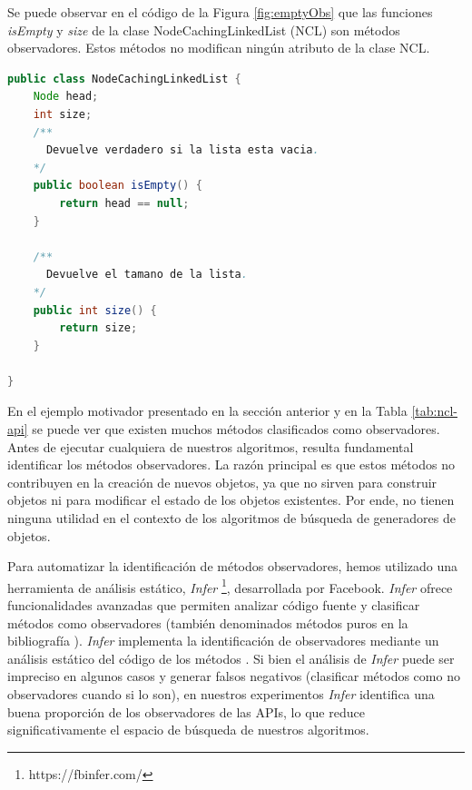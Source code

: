 Se puede observar en el código de la Figura \ref{fig:emptyObs} que las funciones \emph{isEmpty} y \emph{size} de la clase NodeCachingLinkedList (NCL) son métodos observadores.  Estos métodos no modifican ningún atributo de la clase NCL.
 
\begin{lstlisting}[language=Java, label=fig:emptyObs, caption=Algunos métodos observadores de la clase NCL. Se observa que no modifican el estado de NCL., captionpos=b, frame=tb, float=t]
public class NodeCachingLinkedList {
    Node head;
    int size;
    /**
      Devuelve verdadero si la lista esta vacia. 
    */ 
    public boolean isEmpty() { 
        return head == null; 
    }
    
    /**
      Devuelve el tamano de la lista. 
    */ 
    public int size() { 
        return size; 
    }
    
}
\end{lstlisting}


 En el ejemplo motivador presentado en la sección anterior y en la Tabla \ref{tab:ncl-api} se puede ver que existen muchos métodos clasificados como observadores. 
Antes de ejecutar cualquiera de nuestros algoritmos, resulta fundamental identificar los métodos observadores. La razón principal es que estos métodos no contribuyen en la creación de nuevos objetos, ya que no sirven para construir objetos ni para modificar el estado de los objetos existentes. Por ende, no tienen ninguna utilidad en el contexto de los algoritmos de búsqueda de generadores de objetos.

Para automatizar la identificación de métodos observadores, hemos utilizado una herramienta de análisis estático, \emph{Infer} \footnote{https://fbinfer.com/}, desarrollada por Facebook. \emph{Infer} ofrece funcionalidades avanzadas que permiten analizar código fuente y clasificar métodos como observadores \cite{Huang:2012} (también denominados métodos puros en la bibliografía \cite{Huang:2012}). \emph{Infer} implementa la identificación de observadores mediante un análisis estático del código de los métodos \cite{}. Si bien el análisis de \emph{Infer} puede ser impreciso en algunos casos y generar falsos negativos (clasificar métodos como no observadores cuando si lo son), en nuestros experimentos \emph{Infer}  identifica una buena proporción de los observadores de las APIs, lo que reduce significativamente el espacio de búsqueda de nuestros algoritmos.



